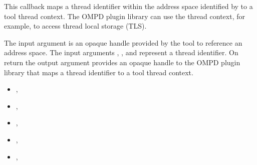 \descr

This callback maps a thread identifier within the address
space identified by  to a tool thread context. The OMPD plugin library
can use the thread context, for example, to access
thread local storage (TLS).

\argdesc

The input argument  is an opaque handle provided by the tool
to reference an address space.
The input arguments ,  , and  represent a thread identifier.
On return the output argument  provides an opaque handle to the OMPD
plugin library that maps a thread identifier to a tool thread context.

\crossreferences
\begin{itemize}
\item
  , 
\item
  , 
\item
  , 
\item
  , 
\item
  , 
\end{itemize}




\label{subsubsubsec:ompd_callback_get_address_space_context_for_thread_fn_t}

